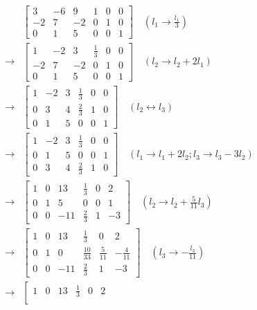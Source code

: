 \begin{align*}
    &\left[\begin{array}{cccccc}
	3 & -6 & 9 & 1 & 0 & 0 \\
	-2 & 7 & -2 & 0 & 1 & 0\\
	0 & 1 & 5 & 0 & 0 & 1
	\end{array}\right] \quad (l_1 \rightarrow \frac{l_1}{3}) \\ \rightarrow
    &\left[\begin{array}{cccccc}
	1 & -2 & 3 & \frac{1}{3} & 0 & 0 \\
	-2 & 7 & -2 & 0 & 1 & 0\\
	0 & 1 & 5 & 0 & 0 & 1
	\end{array}\right] \quad (l_2 \rightarrow l_2 + 2l_1) \\ \rightarrow
    &\left[\begin{array}{cccccc}
	1 & -2 & 3 & \frac{1}{3} & 0 & 0 \\
	0 & 3 & 4 & \frac{2}{3} & 1 & 0\\
	0 & 1 & 5 & 0 & 0 & 1
	\end{array}\right] \quad (l_2 \leftrightarrow l_3) \\ \rightarrow
    &\left[\begin{array}{cccccc}
	1 & -2 & 3 & \frac{1}{3} & 0 & 0 \\
	0 & 1 & 5 & 0 & 0 & 1\\
	0 & 3 & 4 & \frac{2}{3} & 1 & 0
	\end{array}\right] \quad (l_1 \rightarrow l_1 + 2l_2; l_3 \rightarrow l_3 - 3l_2) \\ \rightarrow
    &\left[\begin{array}{cccccc}
	1 & 0 & 13 & \frac{1}{3} & 0 & 2 \\
	0 & 1 & 5 & 0 & 0 & 1 \\
	0 & 0 & -11 & \frac{2}{3} & 1 & -3
	\end{array}\right] \quad (l_2 \rightarrow l_2 + \frac{5}{11}l_3) \\ \rightarrow
    &\left[\begin{array}{cccccc}
	1 & 0 & 13 & \frac{1}{3} & 0 & 2 \\
	0 & 1 & 0 & \frac{10}{33} & \frac{5}{11} & -\frac{4}{11} \\
	0 & 0 & -11 & \frac{2}{3} & 1 & -3
	\end{array}\right] \quad (l_3 \rightarrow -\frac{l_3}{11}) \\ \rightarrow
    &\left[\begin{array}{cccccc}
	1 & 0 & 13 & \frac{1}{3} & 0 & 2 \\

\end{array}
\end{align*}
